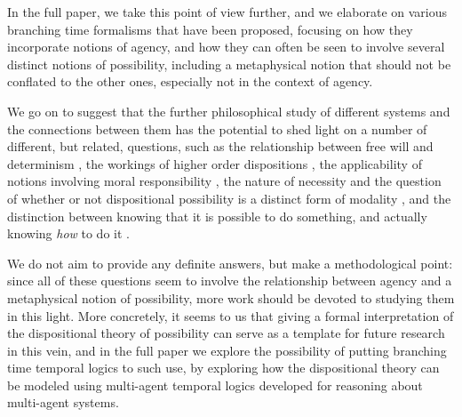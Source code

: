 \documentclass{article}
\begin{document}
In the full paper, we take this point of view further, and we elaborate on various branching time formalisms that have been proposed, focusing on how they incorporate notions of agency, and how they can often be seen to involve several distinct notions of possibility, including a metaphysical notion that should not be conflated to the other ones, especially not in the context of agency.

We go on to suggest that the further philosophical study of different systems and the connections between them has the potential to shed light on a number of different, but related, questions, such as the relationship between free will and determinism \cite{Listfree,strawsonfree}, the workings of higher order dispositions \cite{dispmod}, the applicability of notions involving moral responsibility \cite{frankfurt,mensrea}, the nature of necessity and the question of whether or not dispositional possibility is a distinct form of modality \cite{DM,EaM,Los}, and the distinction between knowing that it is possible to do something, and actually knowing \emph{how} to do it \cite{atlhow,atlhowto}.

We do not aim to provide any definite answers, but make a methodological point: since all of these questions seem to involve the relationship between agency and a metaphysical notion of possibility, more work should be devoted to studying them in this light. More concretely, it seems to us that giving a formal interpretation of the dispositional theory of possibility can serve as a template for future research in this vein, and in the full paper we explore the possibility of putting branching time temporal logics to such use, by exploring how the dispositional theory can be modeled using multi-agent temporal logics developed for reasoning about multi-agent systems.



\end{document}
